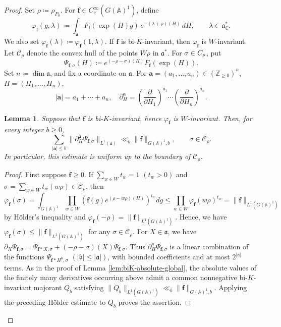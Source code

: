 \documentclass[12pt]{amsart}
\theoremstyle{definition}
\theoremstyle{plain}
\newtheorem{lemma}[definition]{Lemma}
\theoremstyle{remark}
\def\C{\mathbb{C}}%
\def\Z{\mathbb{Z}}%
\def\A{\mathbb{A}}%
\def\inf{\infty}
\newcommand{\fa}{\mathfrak{a}}
\newcommand{\fb}{\mathfrak{b}}
\numberwithin{equation}{section}
\newcommand{\tf}{\tilde{f}}
\newcommand{\sC}{\mathscr{C}}
\begin{document}
\begin{proof}
Set $\rho\coloneqq \rho_{P_0}$.
For $\mathbf{f}\in C_c^\inf(G(\A)^1)$, define
\[
 \varphi_{\mathbf{f}}(g,\lambda)
 \coloneqq \int_\fa F_{\mathbf{f}}(\exp(H) g) \, e^{-(\lambda+\rho)(H)}\,dH, \qquad \lambda\in\fa_\C^*.
\]
We also set $ \varphi_{\mathbf{f}}(\lambda)\coloneqq \varphi_{\mathbf{f}}(1,\lambda)$. 
If $\mathbf{f}$ is bi-$K$-invariant, then $\varphi_{\mathbf{f}}$ is $W$-invariant. 
Let $\sC_\rho$ denote the convex hull of the points $W\rho$ in $\fa^*$.
For $\sigma\in\mathcal \sC_\rho$, put
\[
 \Psi_{\mathbf{f},\sigma}(H)\coloneqq e^{(-\rho-\sigma)(H)}F_{\mathbf{f}}(\exp(H)).
\]
Set $n\coloneqq \dim\fa$, and fix a coordinate on $\fa$. 
For $\mathbf{a}=(a_1,\dots,a_n)\in(\Z_{\ge0})^n$, $H=(H_1,\dots,H_n)$,
\[
|\mathbf{a}|=a_1+\cdots+a_n, \quad  \partial^{\mathbf{a}}_H=\left(\frac{\partial}{\partial H_1}\right)^{a_1}\cdots\left(\frac{\partial}{\partial H_n}\right)^{a_n}.
\]
\begin{lemma}
\label{lem:th45-abel}
Suppose that $\mathbf{f}$ is bi-$K$-invariant, hence $\varphi_{\mathbf{f}}$ is $W$-invariant. 
Then, for every integer \(b\geq0\),
\begin{equation*}
 \sum_{|\mathbf a|\leq b}
 \|\partial_H^{\fa}\Psi_{\mathbf{f},\sigma}\|_{L^1(\fa)}
 \ll_b \|\mathbf{f}\|_{G(\A)^1,b},
 \qquad \sigma\in\sC_\rho.
\end{equation*}
In particular, this estimate is uniform up to the boundary of
$\sC_\rho$.
\end{lemma}
\begin{proof}
First suppose $\mathbf{f}\ge 0$. 
If $\sum_{w\in W}t_w=1$ $(t_w>0)$ and $\sigma=\sum_{w\in W}t_w(w\rho)\in\sC_\rho$, then
\[
\varphi_{\mathbf{f}}(\sigma)=\int_{G(\A)^1} \prod_{w\in W} \left(\mathbf{f}(g)e^{(\rho-w\rho)(H)}\right)^{t_w}dg\le \prod_{w\in W}\varphi_{\mathbf{f}}(w\rho)^{t_w}=\|\mathbf{f}\|_{L^1(G(\A)^1)}
\]
by H\"older's inequality and $\varphi_{\mathbf{f}}(-\rho)=\|\mathbf{f}\|_{L^1(G(\A)^1)}$.
Hence, we have $\varphi_{\mathbf{f}}(\sigma)\le \|\mathbf{f}\|_{L^1(G(\A)^1)}$ for any $\sigma\in\sC_\rho$. 
For $X\in\fa$, we have $\partial_X\Psi_{\mathbf{f},\sigma} =\Psi_{\mathbf{f}*X,\sigma}+(-\rho-\sigma)(X)\Psi_{\mathbf{f},\sigma}$. 
Thus $\partial_H^{\fa}\Psi_{\mathbf{f},\sigma}$ is a linear combination of the functions $\Psi_{\mathbf{f}*H^{\fb},\sigma}$ $(|\fb|\le |\fa|)$, with bounded coefficients and at most $2^{|\fa|}$ terms. 
As in the proof of Lemma \ref{lem:biK-absolute-global}, the absolute values of the finitely many derivatives occurring above admit a common nonnegative bi-\(K\)-invariant majorant $Q_b$ satisfying $\|Q_b\|_{L^1(G(\A)^1)}\ll_b\|\mathbf{f}\|_{G(\mathbb A)^1,b}$. 
Applying the preceding Hölder estimate to $Q_b$ proves the assertion.
\end{proof}



\end{proof}
\end{document}
